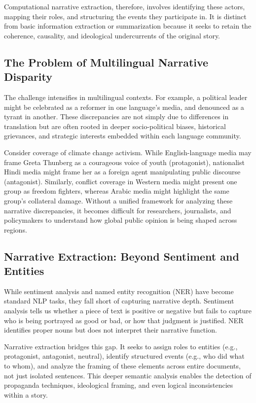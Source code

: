 \documentclass[12pt]{article}
\begin{document}
Computational narrative extraction, therefore, involves identifying these actors, mapping their roles, and structuring the events they participate in. It is distinct from basic information extraction or summarization because it seeks to retain the coherence, causality, and ideological undercurrents of the original story.

\subsection*{The Problem of Multilingual Narrative Disparity}

The challenge intensifies in multilingual contexts. For example, a political leader might be celebrated as a reformer in one language's media, and denounced as a tyrant in another. These discrepancies are not simply due to differences in translation but are often rooted in deeper socio-political biases, historical grievances, and strategic interests embedded within each language community.

Consider coverage of climate change activism. While English-language media may frame Greta Thunberg as a courageous voice of youth (protagonist), nationalist Hindi media might frame her as a foreign agent manipulating public discourse (antagonist). Similarly, conflict coverage in Western media might present one group as freedom fighters, whereas Arabic media might highlight the same group’s collateral damage. Without a unified framework for analyzing these narrative discrepancies, it becomes difficult for researchers, journalists, and policymakers to understand how global public opinion is being shaped across regions.

\subsection*{Narrative Extraction: Beyond Sentiment and Entities}

While sentiment analysis and named entity recognition (NER) have become standard NLP tasks, they fall short of capturing narrative depth. Sentiment analysis tells us whether a piece of text is positive or negative but fails to capture who is being portrayed as good or bad, or how that judgment is justified. NER identifies proper nouns but does not interpret their narrative function.

Narrative extraction bridges this gap. It seeks to assign roles to entities (e.g., protagonist, antagonist, neutral), identify structured events (e.g., who did what to whom), and analyze the framing of these elements across entire documents, not just isolated sentences. This deeper semantic analysis enables the detection of propaganda techniques, ideological framing, and even logical inconsistencies within a story.
\end{document}
